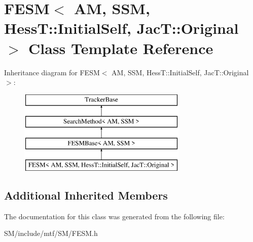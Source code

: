 \hypertarget{classFESM_3_01AM_00_01SSM_00_01HessT_1_1InitialSelf_00_01JacT_1_1Original_01_4}{\section{F\-E\-S\-M$<$ A\-M, S\-S\-M, Hess\-T\-:\-:Initial\-Self, Jac\-T\-:\-:Original $>$ Class Template Reference}
\label{classFESM_3_01AM_00_01SSM_00_01HessT_1_1InitialSelf_00_01JacT_1_1Original_01_4}
}
Inheritance diagram for F\-E\-S\-M$<$ A\-M, S\-S\-M, Hess\-T\-:\-:Initial\-Self, Jac\-T\-:\-:Original $>$\-:\begin{figure}[H]
\begin{center}
\leavevmode
\includegraphics[height=4.000000cm]{classFESM_3_01AM_00_01SSM_00_01HessT_1_1InitialSelf_00_01JacT_1_1Original_01_4}
\end{center}
\end{figure}
\subsection*{Additional Inherited Members}


The documentation for this class was generated from the following file\-:\begin{DoxyCompactItemize}
\item 
S\-M/include/mtf/\-S\-M/F\-E\-S\-M.\-h\end{DoxyCompactItemize}
